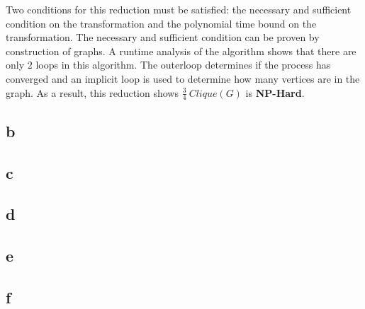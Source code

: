\documentclass[12pt]{article}
\begin{document}
Two conditions for this reduction must be satisfied: the necessary and sufficient
condition on the transformation and the polynomial time bound on the transformation.
The necessary and sufficient condition can be proven by construction of graphs.  A
runtime analysis of the algorithm shows that there are only $2$ loops in this 
algorithm.  The outerloop determines if the process has converged and an implicit
loop is used to determine how many vertices are in the graph.  As a result, this
reduction shows $\frac{3}{4}\ Clique(G)$ is \textbf{NP-Hard}. 
\subsection*{b}
\subsection*{c}
\subsection*{d}
\subsection*{e}
\subsection*{f}
\end{document}

